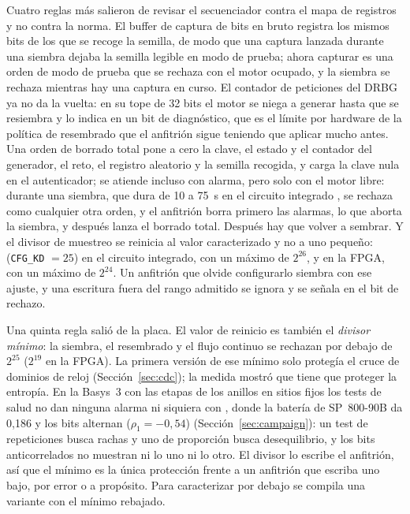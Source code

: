Cuatro reglas más salieron de revisar el secuenciador contra el mapa de
registros y no contra la norma. El buffer de captura de bits en bruto
registra los mismos bits de los que se recoge la semilla, de modo que una
captura lanzada durante una siembra dejaba la semilla legible en modo de
prueba; ahora capturar es una orden de modo de prueba que se rechaza con
el motor ocupado, y la siembra se rechaza mientras hay una captura en
curso. El contador de peticiones del \ac{DRBG} ya no da la vuelta: en su
tope de 32 bits el motor se niega a generar hasta que se resiembra y lo
indica en un bit de diagnóstico, que es el límite por hardware de la
política de resembrado que el anfitrión sigue teniendo que aplicar mucho
antes. Una orden de borrado total pone a cero la clave, el estado y el
contador del generador, el reto, el registro aleatorio y la semilla
recogida, y carga la clave nula en el autenticador; se atiende incluso
con alarma, pero solo con el motor libre: durante una siembra, que dura
de 10 a 75~s en el circuito integrado \est{}, se rechaza como cualquier
otra orden, y el anfitrión borra primero las alarmas, lo que aborta la
siembra, y después lanza el borrado total. Después hay que volver a
sembrar. Y el divisor de muestreo
se reinicia al valor caracterizado y no a uno pequeño: 
(\texttt{CFG\_KD} $= 25$) en el circuito integrado, con un máximo de
$2^{26}$, y  en la \ac{FPGA}, con un máximo de $2^{24}$. Un
anfitrión que olvide configurarlo siembra con ese ajuste, y una
escritura fuera del rango admitido se ignora y se señala en el bit de
rechazo.

Una quinta regla salió de la placa. El valor de reinicio es también el
\emph{divisor mínimo}: la siembra, el resembrado y el flujo continuo se
rechazan por debajo de $2^{25}$ ($2^{19}$ en la \ac{FPGA}). La primera
versión de ese mínimo solo protegía el cruce de dominios de reloj
(Sección~\ref{sec:cdc}); la medida mostró que tiene que proteger la
entropía. En la Basys~3 con las etapas de los anillos en sitios fijos
los tests de salud no dan ninguna alarma ni siquiera con , donde
la batería de SP~800-90B da 0,186 y los bits alternan
($\rho_1 = -0{,}54$) \meas{} (Sección~\ref{sec:campaign}): un test de
repeticiones busca rachas y uno de proporción busca desequilibrio, y
los bits anticorrelados no muestran ni lo uno ni lo otro. El divisor lo
escribe el anfitrión, así que el mínimo es la única protección frente a
un anfitrión que escriba uno bajo, por error o a propósito. Para
caracterizar por debajo se compila una variante con el mínimo rebajado.

